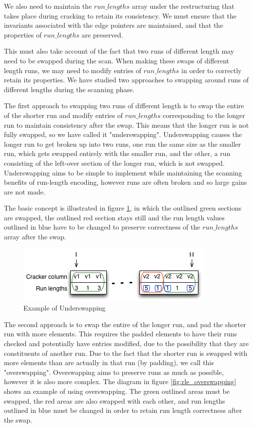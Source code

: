 We also need to maintain the $run\_lengths$ array under the restructuring that takes place during cracking to retain its consistency. We must ensure that the invariants associated with the edge pointers are maintained, and that the properties of $run\_lengths$ are preserved.

This must also take account of the fact that two runs of different length may need to be swapped during the scan. When making these swaps of different length runs, we may need to modify entries of $run\_lengths$ in order to correctly retain its properties. We have studied two approaches to swapping around runs of different lengths during the scanning phase.

The first approach to swapping two runs of different length is to swap the entire of the shorter run and modify entries of $run\_lengths$ corresponding to the longer run to maintain consistency after the swap. This means that the longer run is not fully swapped, so we have called it "underswapping". Underswapping causes the longer run to get broken up into two runs, one run the same size as the smaller run, which gets swapped entirely with the smaller run, and the other, a run consisting of the left-over section of the longer run, which is not swapped. Underswapping aims to be simple to implement while maintaining the scanning benefits of run-length encoding, however runs are often broken and so large gains are not made.

The basic concept is illustrated in figure \ref{fig:rle_underswapping}, in which the outlined green sections are swapped, the outlined red section stays still and the run length values outlined in blue have to be changed to preserve correctness of the $run\_lengths$ array after the swap.

\begin{figure}[H]
  \centering
  \includegraphics[]{images/d10_rle_underswapping}
  \caption{Example of Underswapping}
  \label{fig:rle_underswapping}
\end{figure}

The second approach is to swap the entire of the longer run, and pad the shorter run with more elements. This requires the padded elements to have their runs checked and potentially have entries modified, due to the possibility that they are constituents of another run. Due to the fact that the shorter run is swapped with more elements than are actually in that run (by padding), we call this "overswapping". Overswapping aims to preserve runs as much as possible, however it is also more complex. The diagram in figure \ref{fig:rle_overswapping} shows an example of using overswapping. The green outlined areas must be swapped, the red areas are also swapped with each other, and run lengths outlined in blue must be changed in order to retain run length correctness after the swap.

